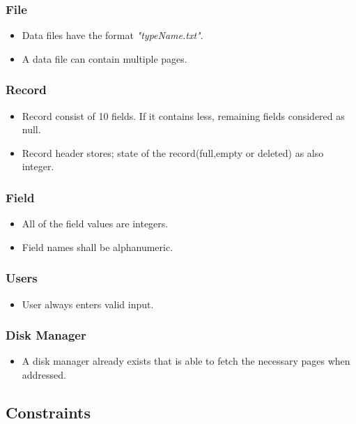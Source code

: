 \documentclass{article}
\begin{document}
        \subsubsection{File}
            \begin{itemize}
                \item Data files have the format \emph{"typeName.txt"}.
                \item A data file can contain multiple pages.
            \end{itemize}
        \subsubsection{Record}
            \begin{itemize}
                \item Record consist of 10 fields. If it contains less, remaining fields considered as null.
                \item Record header stores; state of the record(full,empty or deleted) as also integer.
            \end{itemize}
        \subsubsection{Field}
            \begin{itemize}
                \item All of the field values are integers.
                \item Field names shall be alphanumeric.
            \end{itemize}
        \subsubsection{Users}
            \begin{itemize}
                \item User always enters valid input.
            \end{itemize}
        \subsubsection{Disk Manager}
            \begin{itemize}
                \item A disk manager already exists that is able to fetch the necessary pages when addressed.
            \end{itemize}
    \subsection{Constraints}
\end{document}
